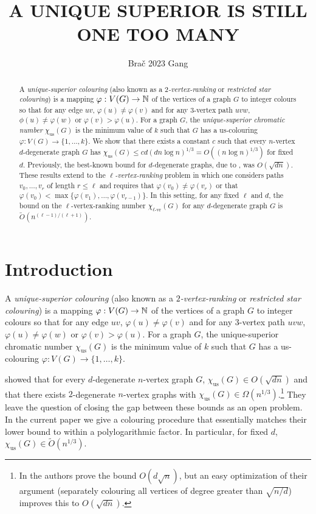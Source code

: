 \documentclass{patmorin}
\title{\MakeUppercase{A Unique Superior is Still One Too Many}}
\author{Bra\v{c} 2023 Gang}
\newcommand{\defin}[1]{\emph{\color{brightmaroon}#1}}
\newcommand{\rn}[1]{\chi_{\operatorname{#1-vr}}}
\newcommand{\trn}{\chi_{\mathrm{us}}}
\newcommand{\lrn}{\rn{\ell}}
\begin{document}
\maketitle

\begin{abstract}
  A \defin{unique-superior colouring} (also known as a \defin{$2$-vertex-ranking} or \defin{restricted star colouring}) is a mapping $\varphi:V(G)\to\mathbb{N}$ of the vertices of a graph $G$ to integer colours so that for any edge $uv$, $\varphi(u)\neq \varphi(v)$ and for any $3$-vertex path $uvw$, $\phi(u)\neq\varphi(w)$ or $\varphi(v)>\varphi(u)$.  For a graph $G$, the \defin{unique-superior chromatic number} $\trn(G)$ is the minimum value of $k$ such that $G$ has a us-colouring $\varphi:V(G)\to\{1,\ldots,k\}$.  We show that there exists a constant $c$ such that every $n$-vertex $d$-degenerate graph $G$ has $\trn(G) \le cd(dn\log n)^{1/3}=O((n\log n)^{1/3})$ for fixed $d$.  Previously, the best-known bound for $d$-degenerate graphs, due to \citet{karpas.neiman.ea:on}, was $O(\sqrt{dn})$. These results extend to the \defin{$\ell$-vertex-ranking} problem in which one considers paths $v_0,\ldots,v_r$ of length $r\le \ell$ and requires that $\varphi(v_0)\neq\varphi(v_r)$ or that $\varphi(v_0)<\max\{\varphi(v_1),\ldots,\varphi(v_{r-1})\}$.  In this setting, for any fixed $\ell$ and $d$, the bound on the $\ell$-vertex-ranking number $\lrn(G)$ for any $d$-degenerate graph $G$ is $\tilde{O}(n^{(\ell-1)/(\ell+1)})$.
\end{abstract}


%



\section{Introduction}

A \defin{unique-superior colouring} (also known as a \defin{$2$-vertex-ranking} or \defin{restricted star colouring}) is a mapping $\varphi:V(G)\to\mathbb{N}$ of the vertices of a graph $G$ to integer colours so that for any edge $uv$, $\varphi(u)\neq \varphi(v)$ and for any $3$-vertex path $uvw$, $\varphi(u)\neq\varphi(w)$ or $\varphi(v)>\varphi(u)$.  For a graph $G$, the unique-superior chromatic number $\trn(G)$ is the minimum value of $k$ such that $G$ has a us-colouring $\varphi:V(G)\to\{1,\ldots,k\}$.

\citet{karpas.neiman.ea:on} showed that for every $d$-degenerate $n$-vertex graph $G$, $\trn(G)\in O(\sqrt{dn})$ and that there exists $2$-degenerate $n$-vertex graphs with $\trn(G)\in\Omega(n^{1/3})$.\footnote{In \cite[Theorem~6.2]{karpas.neiman.ea:on} the authors prove the bound $O(d\sqrt{n})$, but an easy optimization of their argument (separately colouring all vertices of degree greater than $\sqrt{n/d}$) improves this to $O(\sqrt{dn})$.}  They leave the question of closing the gap between these bounds as an open problem. In the current paper we give a colouring procedure that essentially matches their lower bound to within a polylogarithmic factor.  In particular, for fixed $d$, $\trn(G)\in \tilde{O}(n^{1/3})$.
\end{document}
